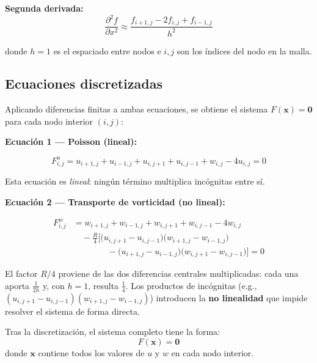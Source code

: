 \documentclass[12pt, a4paper]{article}
\begin{document}
\textbf{Segunda derivada:}
\begin{equation}
  \frac{\partial^{2} f}{\partial x^{2}}
  \approx \frac{f_{i+1,j} - 2f_{i,j} + f_{i-1,j}}{h^{2}}
\end{equation}

donde $h = 1$ es el espaciado entre nodos e $i, j$ son los índices del nodo
en la malla.

\subsection{Ecuaciones discretizadas}

Aplicando diferencias finitas a ambas ecuaciones, se obtiene el sistema
$F(\mathbf{x}) = \mathbf{0}$ para cada nodo interior $(i,j)$:

\bigskip
\noindent\textbf{Ecuación 1 — Poisson (lineal):}

\begin{equation}
  F^{u}_{i,j}
  = u_{i+1,j} + u_{i-1,j} + u_{i,j+1} + u_{i,j-1} + w_{i,j} - 4u_{i,j}
  = 0
  \label{eq:disc_poisson}
\end{equation}

Esta ecuación es \emph{lineal}: ningún término multiplica incógnitas entre sí.

\bigskip
\noindent\textbf{Ecuación 2 — Transporte de vorticidad (no lineal):}

\begin{equation}
  \begin{aligned}
    F^{w}_{i,j}
    &= w_{i+1,j} + w_{i-1,j} + w_{i,j+1} + w_{i,j-1} - 4w_{i,j} \\
    &\quad - \frac{R}{4}\Big[
        \bigl(u_{i,j+1} - u_{i,j-1}\bigr)\bigl(w_{i+1,j} - w_{i-1,j}\bigr) \\
    &\qquad\qquad - \bigl(u_{i+1,j} - u_{i-1,j}\bigr)\bigl(w_{i,j+1} - w_{i,j-1}\bigr)
    \Big] = 0
  \end{aligned}
  \label{eq:disc_vort}
\end{equation}

El factor $R/4$ proviene de las dos diferencias centrales multiplicadas: cada
una aporta $\tfrac{1}{2h}$ y, con $h=1$, resulta $\tfrac{1}{4}$. Los productos
de incógnitas (e.g., $(u_{i,j+1} - u_{i,j-1})(w_{i+1,j} - w_{i-1,j})$)
introducen la \textbf{no linealidad} que impide resolver el sistema de forma directa.

Tras la discretización, el sistema completo tiene la forma:
\begin{equation}
  F(\mathbf{x}) = \mathbf{0}
\end{equation}
donde $\mathbf{x}$ contiene todos los valores de $u$ y $w$ en cada nodo interior.
\end{document}
